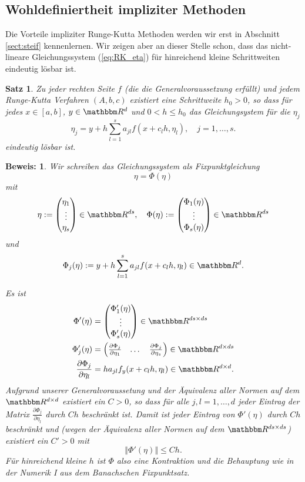 \documentclass[12pt,a4paper]{book}
\theoremstyle{break}
\newtheorem{theorem}{Satz}[chapter]
\theoremstyle{nonumberplain}
\newtheorem{beweis}{Beweis:}
\newcommand{\R}{\mathbbm R}
\newcommand{\norm}[1]{\left\Vert#1\right\Vert}		%
\newcommand{\1}{\mathbbm{1}} 			      	%
\newcommand{\labeq}[1]{\label{eq:#1}}			%
\newcommand{\req}[1]{(\ref{eq:#1})}
\begin{document}
\subsection{Wohldefiniertheit impliziter Methoden}

Die Vorteile impliziter Runge-Kutta Methoden werden wir erst in Abschnitt \ref{sect:steif} kennenlernen. 
Wir zeigen aber an dieser Stelle schon, dass das nicht-lineare Gleichungssystem \req{RK_eta} für hinreichend kleine Schrittweiten eindeutig lösbar ist.

\begin{theorem}
Zu jeder rechten Seite $f$ (die die Generalvoraussetzung erfüllt)
und jedem Runge-Kutta Verfahren $(A,b,c)$ existiert eine Schrittweite $h_0>0$,
so dass für jedes $x\in [a,b]$, $y\in \R^d$ und $0<h\leq h_0$ das 
Gleichungsystem für die $\eta_j$
\begin{equation*}%
\eta_j = y + h \sum_{l=1}^s a_{jl} f(x + c_l h,\eta_l), \quad j=1,\ldots,s.
\end{equation*}
eindeutig lösbar ist.
\end{theorem}
\begin{beweis}
Wir schreiben das Gleichungssystem als Fixpunktgleichung 
\[
\eta=\Phi(\eta)
\]
mit 
\[
\eta:=\begin{pmatrix} \eta_1\\ \vdots \\ \eta_s \end{pmatrix}\in \R^{ds}, \quad
\Phi(\eta):=\begin{pmatrix} \Phi_1(\eta)\\ \vdots \\ \Phi_s(\eta) \end{pmatrix}\in \R^{ds}
\]
und 
\[
\Phi_j(\eta):=y + h \sum_{l=1}^s a_{jl} f(x + c_l h,\eta_l)\in \R^d.
\]

Es ist
\begin{align*}
\Phi'(\eta)&=\begin{pmatrix} \Phi_1'(\eta)\\ \vdots \\ \Phi_s'(\eta) \end{pmatrix}\in \R^{ds\times ds}\\
\Phi_j'(\eta)&= \begin{pmatrix} \frac{\partial \Phi_j}{\partial \eta_1} & \dots & \frac{\partial \Phi_j}{\partial \eta_s} \end{pmatrix}\in \R^{d\times ds}\\
\frac{\partial \Phi_j}{\partial \eta_l} &=  h a_{jl} f_y(x + c_l h,\eta_l) \in \R^{d\times d}.
\end{align*}
Aufgrund unserer Generalvoraussetung und der Äquivalenz aller Normen auf dem $\R^{d\times d}$ existiert ein $C>0$, so
dass für alle $j,l=1,\ldots,d$ jeder Eintrag der Matrix $\frac{\partial \Phi_j}{\partial \eta_l}$ durch $Ch$ beschränkt ist.
Damit ist jeder Eintrag von $\Phi'(\eta)$ durch $Ch$ beschränkt und (wegen der Äquivalenz aller Normen auf dem $\R^{ds\times ds}$) existiert ein $C'>0$ mit
\[
\norm{\Phi'(\eta)}\leq Ch.
\]
Für hinreichend kleine $h$ ist $\Phi$ also eine Kontraktion und die Behauptung 
wie in der Numerik I aus dem Banachschen Fixpunktsatz.
\end{beweis}
\end{document}
